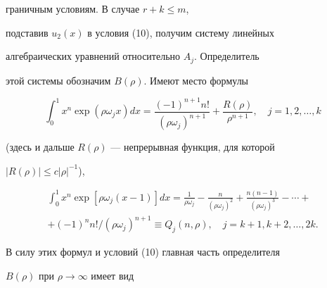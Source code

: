 граничным условиям. В случае $r+k\le m$, 


подставив $u_2(x)$ в условия (10), получим систему линейных  


алгебраических уравнений относительно $A_j$. Определитель  


этой системы обозначим $B(\rho)$. Имеют место формулы 


$$ 


\int^1_0 x^n\exp(\rho\omega_j x)dx= 


\frac{(-1)^{n+1}n!}{(\rho\omega_j)^{n+1}}+\frac{R(\rho)}{\rho^{n+1}}, 


\quad j=1,2,\dotsc,k 


$$ 


(здесь и дальше $R(\rho)$ --- непрерывная функция, для которой 


$|R(\rho)|\le c|\rho|^{-1}$), 


\begin{multline*} 


\int^1_0 x^n\exp[\rho\omega_j (x-1)]dx=\frac{1}{\rho\omega_j}- 


\frac{n}{(\rho\omega_j)^2}+\frac{n(n-1)}{(\rho\omega_j)^3}- 


\dotsb+ \\ +(-1)^n{n!}/(\rho\omega_j)^{n+1}\equiv Q_j(n,\rho), 


\quad j=k+1,k+2,\dotsc,2k. 


\end{multline*}  


В силу этих формул и условий (10) главная часть определителя 


$B(\rho)$ при $\rho\to\infty$ имеет вид 


